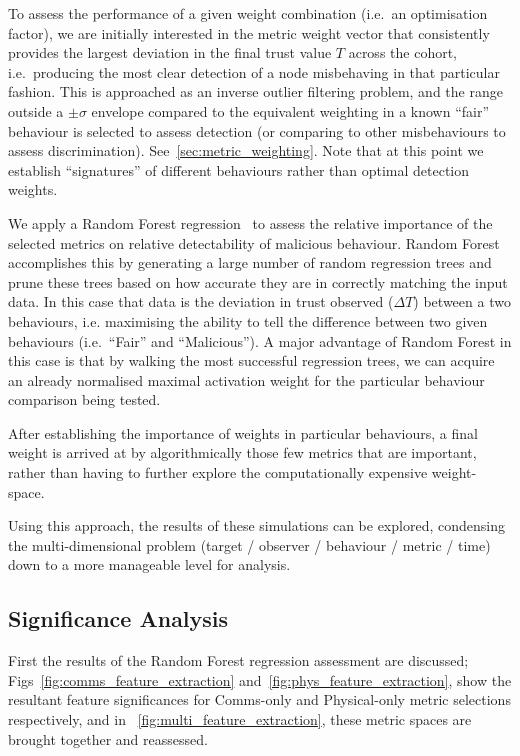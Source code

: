 To assess the performance of a given weight combination (i.e.\ an optimisation factor), we are initially interested in the metric weight vector that consistently provides the largest deviation in the final trust value $T$ across the cohort, i.e.\ producing the most clear detection of a node misbehaving in that particular fashion.
This is approached as an inverse outlier filtering problem, and the range outside a $\pm\sigma$ envelope compared to the equivalent weighting in a known ``fair'' behaviour is selected to assess detection (or comparing to other misbehaviours to assess discrimination).
See~\autoref{sec:metric_weighting}.
Note that at this point we establish ``signatures'' of different behaviours rather than optimal detection weights.

We apply a Random Forest regression~\cite{Breiman2001} to assess the relative importance of the selected metrics on relative detectability of malicious behaviour. 
Random Forest accomplishes this by generating a large number of random regression trees and prune these trees based on how accurate they are in correctly matching the input data.
In this case that data is the deviation in trust observed ($\Delta T$) between a two behaviours, i.e. maximising the ability to tell the difference between two given behaviours (i.e.\ ``Fair'' and ``Malicious'').
A major advantage of Random Forest in this case is that by walking the most successful regression trees, we can acquire an already normalised maximal activation weight for the particular behaviour comparison being tested.

After establishing the importance of weights in particular behaviours, a final weight is arrived at by algorithmically those few metrics that are important, rather than having to further explore the computationally expensive weight-space.

Using this approach, the results of these simulations can be explored, condensing the multi-dimensional problem (target / observer / behaviour / metric / time) down to a more manageable level for analysis.

\subsection{Significance Analysis}

First the results of the Random Forest regression assessment are discussed; Figs~\ref{fig:comms_feature_extraction} and~\ref{fig:phys_feature_extraction}, show the resultant feature significances for Comms-only and Physical-only metric selections respectively, and in ~\autoref{fig:multi_feature_extraction}, these metric spaces are brought together and reassessed.

